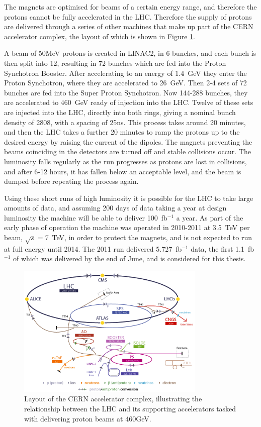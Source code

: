The magnets are optimised for beams of a certain energy range, and therefore the protons cannot be fully accelerated in the LHC. Therefore the supply of protons are delivered through a series of other machines that make up part of the CERN accelerator complex, the layout of which is shown in Figure \ref{fig:LHCinject}. 

A beam of 50MeV protons is created in LINAC2, in 6 bunches, and each bunch is then split into 12, resulting in 72 bunches which are fed into the Proton Synchotron Booster. After accelerating to an energy of 1.4~GeV they enter the Proton Synchotron, where they are accelerated to 26~GeV. Then 2-4 sets of 72 bunches are fed into the Super Proton Synchotron. Now 144-288 bunches, they are accelerated to 460~GeV ready of injection into the LHC. Twelve of these sets are injected into the LHC, directly into both rings, giving a nominal bunch density of 2808, with a spacing of 25ns. This process takes around 20 minutes, and then the LHC takes a further 20 minutes to ramp the protons up to the desired energy by raising the current of the dipoles. The magnets preventing the beams coinciding in the detectors are turned off and stable collisions occur. The luminosity falls regularly as the run progresses as protons are lost in collisions, and after 6-12 hours, it has fallen below an acceptable level, and the beam is dumped before repeating the process again. 

Using these short runs of high luminosity it is possible for the LHC to take large amounts of data, and assuming 200 days of data taking a year  at design luminosity the machine will be able to deliver 100~fb$^{-1}$ a year. As part of the early phase of operation the machine was operated in 2010-2011 at 3.5~TeV per beam, $\sqrt{s} = $7~TeV, in order to protect the magnets, and is not expected to run at full energy until 2014. The 2011 run delivered 5.727~fb$^{-1}$ data, the first 1.1~fb$^{-1}$ of which was delivered by the end of June, and is considered for this thesis.

\begin{figure}[htbp]
\centering
\includegraphics[width=0.8\textwidth]{Figures/Detector/injection}
\caption{Layout of the CERN accelerator complex, illustrating the relationship between the LHC and its supporting accelerators tasked with delivering proton beams at 460GeV.}
\label{fig:LHCinject}
\end{figure}



